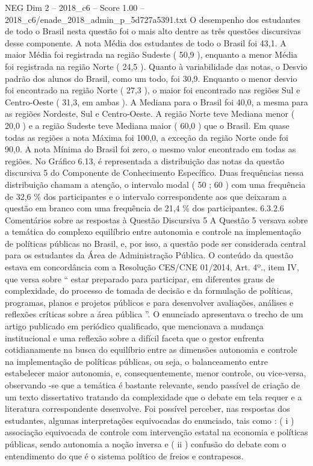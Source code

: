 \begin{textsample}{NEG Dim 2 – 2018\_c6 – Score 1.00 – 2018\_c6/enade\_2018\_admin\_p\_5d727a5391.txt}
O desempenho dos estudantes de todo o Brasil nesta questão foi o mais alto dentre as três questões discursivas desse componente.
A nota Média dos estudantes de todo o Brasil foi 43,1.
A maior Média foi registrada na região Sudeste ( 50,9 ), enquanto a menor Média foi registrada na região Norte ( 24,5 ).
Quanto à variabilidade das notas, o Desvio padrão dos alunos do Brasil, como um todo, foi 30,9.
Enquanto o menor desvio foi encontrado na região Norte ( 27,3 ), o maior foi encontrado nas regiões Sul e Centro-Oeste ( 31,3, em ambas ).
A Mediana para o Brasil foi 40,0, a mesma para as regiões Nordeste, Sul e Centro-Oeste.
A região Norte teve Mediana menor ( 20,0 ) e a região Sudeste teve Mediana maior ( 60,0 ) que o Brasil.
Em quase todas as regiões a nota Máxima foi 100,0, a exceção da região Norte onde foi 90,0.
A nota Mínima do Brasil foi zero, o mesmo valor encontrado em todas as regiões.
No Gráfico 6.13, é representada a distribuição das notas da questão discursiva 5 do Componente de Conhecimento Específico.
Duas frequências nessa distribuição chamam a atenção, o intervalo modal ( 50 ; 60 ) com uma frequência de 32,6 \% dos participantes e o intervalo correspondente aos que deixaram a questão em branco com uma frequência de 21,4 \% dos participantes. 6.3.2.6 Comentários sobre as respostas à Questão Discursiva 5 A Questão 5 versava sobre a temática do complexo equilíbrio entre autonomia e controle na implementação de políticas públicas no Brasil, e, por isso, a questão pode ser considerada central para os estudantes da Área de Administração Pública.
O conteúdo da questão estava em concordância com a Resolução CES/CNE 01/2014, Art. 4º., item IV, que versa sobre “ estar preparado para participar, em diferentes graus de complexidade, do processo de tomada de decisão e da formulação de políticas, programas, planos e projetos públicos e para desenvolver avaliações, análises e reflexões críticas sobre a área pública ”.
O enunciado apresentava o trecho de um artigo publicado em periódico qualificado, que mencionava a mudança institucional e uma reflexão sobre a difícil faceta que o gestor enfrenta cotidianamente na busca do equilíbrio entre as dimensões autonomia e controle na implementação de políticas públicas, ou seja, o balanceamento entre estabelecer maior autonomia, e, consequentemente, menor controle, ou vice-versa, observando -se que a temática é bastante relevante, sendo passível de criação de um texto dissertativo tratando da complexidade que o debate em tela requer e a literatura correspondente desenvolve.
Foi possível perceber, nas respostas dos estudantes, algumas interpretações equivocadas do enunciado, tais como : ( i ) associação equivocada de controle com intervenção estatal na economia e políticas públicas, sendo autonomia a noção inversa e ( ii ) confusão do debate com o entendimento do que é o sistema político de freios e contrapesos.

\end{textsample}
